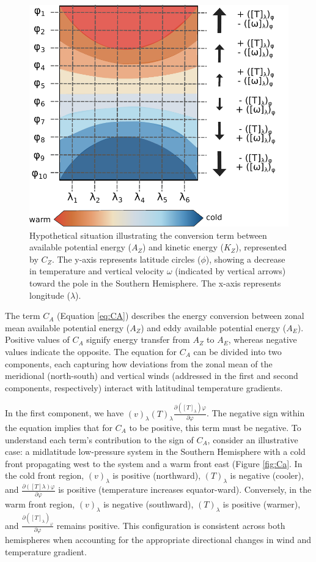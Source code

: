 \begin{figure}[h]
\begin{center}
\setcaptionmargin{1cm}
\includegraphics[width=0.75\columnwidth,angle=0]{fig/Cz.pdf}
\caption[$C_Z$ - Representation]{Hypothetical situation illustrating the conversion term between available potential energy ($A_Z$) and kinetic energy ($K_Z$), represented by $C_Z$. The y-axis represents latitude circles ($\phi$), showing a decrease in temperature and vertical velocity $\omega$ (indicated by vertical arrows) toward the pole in the Southern Hemisphere. The x-axis represents longitude ($\lambda$).}
\label{Cz}
\end{center}
\end{figure}


The term $C_A$ (Equation \ref{eq:CA}) describes the energy conversion between zonal mean available potential energy ($A_Z$) and eddy available potential energy ($A_E$). Positive values of $C_A$ signify energy transfer from $A_Z$ to $A_E$, whereas negative values indicate the opposite. The equation for $C_A$ can be divided into two components, each capturing how deviations from the zonal mean of the meridional (north-south) and vertical winds (addressed in the first and second components, respectively) interact with latitudinal temperature gradients.

In the first component, we have $(v)_\lambda (T)_\lambda \frac{\partial ([T]_\lambda)\varphi}{\partial \varphi}$. The negative sign within the equation implies that for $C_A$ to be positive, this term must be negative. To understand each term's contribution to the sign of $C_A$, consider an illustrative case: a midlatitude low-pressure system in the Southern Hemisphere with a cold front propagating west to the system and a warm front east (Figure \ref{fig:Ca}. In the cold front region, $(v)_\lambda$ is positive (northward), $(T)_\lambda$ is negative (cooler), and $\frac{\partial ([T]\lambda)\varphi}{\partial \varphi}$ is positive (temperature increases equator-ward). Conversely, in the warm front region, $(v)_\lambda$ is negative (southward), $(T)_\lambda$ is positive (warmer), and $\frac{\partial ([T]_\lambda)_\varphi}{\partial \varphi}$ remains positive. This configuration is consistent across both hemispheres when accounting for the appropriate directional changes in wind and temperature gradient.

